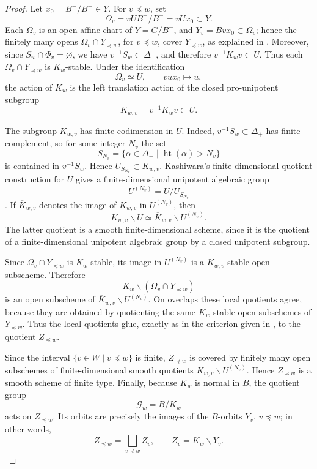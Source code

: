 \documentclass{amsart}
\theoremstyle{definition}
\numberwithin{equation}{section}
\begin{document}
\begin{proof}
Let \(x_0=B^-/B^-\in Y\).  For \(v\preceq w\), set
\[
\Omega_v=vUB^-/B^-=vUx_0\subset Y .
\]
Each \(\Omega_v\) is an open affine chart of
\(Y=G/B^-\), and \(Y_v=Bvx_0\subset \Omega_v\); hence the finitely many opens
\(\Omega_v\cap Y_{\preceq w}\), for \(v\preceq w\), cover \(Y_{\preceq w}\), as explained in \cite[\S5.8]{K}.  Moreover, since
\(S_w\cap\Phi_v=\varnothing\), we have \(v^{-1}S_w\subset\Delta_+\), and therefore
\(v^{-1}K_wv\subset U\).  Thus each \(\Omega_v\cap Y_{\preceq w}\) is \(K_w\)-stable.
Under the identification
\[
\Omega_v\simeq U,\qquad vu x_0\longmapsto u,
\]
the action of \(K_w\) is the left translation action of the closed pro-unipotent
subgroup
\[
K_{w,v}=v^{-1}K_wv\subset U .
\]

The subgroup \(K_{w,v}\) has finite codimension in \(U\).  Indeed,
\(v^{-1}S_w\subset\Delta_+\) has finite complement, so for some integer \(N_v\) the
set
\[
S_{N_v}=\{\alpha\in\Delta_+\mid \operatorname{ht}(\alpha)>N_v\}
\]
is contained in \(v^{-1}S_w\).  Hence \(U_{S_{N_v}}\subset K_{w,v}\).  Kashiwara's
finite-dimensional quotient construction for \(U\) gives a finite-dimensional
unipotent algebraic group
\[
U^{(N_v)}=U/U_{S_{N_v}}
\]
\cite[Lemma 4.4.2]{K}.  If \(\overline K_{w,v}\) denotes the image
of \(K_{w,v}\) in \(U^{(N_v)}\), then
\[
K_{w,v}\backslash U \simeq
\overline K_{w,v}\backslash U^{(N_v)} .
\]
The latter quotient is a smooth finite-dimensional scheme, since it is the quotient
of a finite-dimensional unipotent algebraic group by a closed unipotent subgroup.

Since \(\Omega_v\cap Y_{\preceq w}\) is \(K_w\)-stable, its image in \(U^{(N_v)}\) is a
\(\overline K_{w,v}\)-stable open subscheme.  Therefore
\[
K_w\backslash(\Omega_v\cap Y_{\preceq w})
\]
is an open subscheme of
\(\overline K_{w,v}\backslash U^{(N_v)}\).  On overlaps these local quotients agree,
because they are obtained by quotienting the same \(K_w\)-stable open subschemes of
\(Y_{\preceq w}\).  Thus the local quotients glue, exactly as in the criterion given in \cite[\S5.7]{K}, to the quotient \(Z_{\preceq w}\).

Since the interval \(\{v\in W\mid v\preceq w\}\) is finite, \(Z_{\preceq w}\) is covered by
finitely many open subschemes of finite-dimensional smooth quotients
\(\overline K_{w,v}\backslash U^{(N_v)}\).  Hence \(Z_{\preceq w}\) is a smooth scheme of finite type.  Finally, because $K_w$ is normal in $B$, the quotient
group
\[
\mathcal G_w=B/K_w
\]
acts on \(Z_{\preceq w}\).  Its orbits are precisely the images of the \(B\)-orbits
\(Y_v\), \(v\preceq w\); in other words,
\[
Z_{\preceq w}=\bigsqcup_{v\preceq w} Z_v,\qquad
Z_v=K_w\backslash Y_v .
\]
\end{proof}
\end{document}
